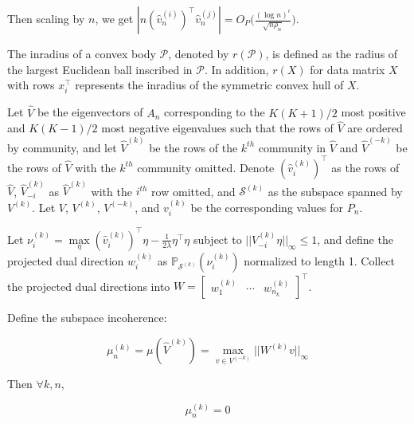 \documentclass[12pt]{article}
\begin{document}
Then scaling by \(n\), we get
\(|n (\hat{v}_n^{(i)})^\top \hat{v}_n^{(j)}| = O_P \big( \frac{(\log n)^c}{\sqrt{n \rho_n}} \big)\).

\begin{definition}
The inradius of a convex body $\mathcal{P}$, denoted by $r(\mathcal{P})$, is
defined as the radius of the largest Euclidean ball inscribed in $\mathcal{P}$.
In addition, $r(X)$ for data matrix $X$ with rows $x_i^\top$ represents
the inradius of the symmetric convex hull of $X$.
\end{definition}

\begin{definition}
\end{definition}

\begin{lemma}
\label{lemma2}
Let $\hat{V}$ be the eigenvectors of $A_n$ corresponding to the $K (K + 1) / 2$ most positive and $K (K - 1) / 2$ most negative eigenvalues such that the rows of $\hat{V}$ are ordered by community, and let $\hat{V}^{(k)}$ be the rows of the $k^{th}$ community in $\hat{V}$ and $\hat{V}^{(-k)}$ be the rows of $\hat{V}$ with the $k^{th}$ community omitted. Denote $(\hat{v}_i^{(k)})^\top$ as the rows of $\hat{V}$, $\hat{V}_{-i}^{(k)}$ as $\hat{V}^{(k)}$ with the $i^{th}$ row omitted, and $\mathcal{S}^{(k)}$ as the subspace spanned by $V^{(k)}$. Let $V$, $V^{(k)}$, $V^{(-k)}$, and $v_i^{(k)}$ be the corresponding values for $P_n$.

Let $\nu_{i}^{(k)} = \max\limits_\eta (\hat{v}_i^{(k)})^\top \eta - \frac{1}{2 \lambda} \eta^\top \eta$ subject to $||V_{-i}^{(k)} \eta||_\infty \leq 1$, and define the projected dual direction $w_{i}^{(k)}$ as $\mathbb{P}_{\mathcal{S}^{(k)}}(\nu_i^{(k)})$ normalized to length 1. Collect the projected dual directions into $W = \begin{bmatrix} w_1^{(k)} & \cdots & w_{n_k}^{(k)} \end{bmatrix}^\top$.

Define the subspace incoherence:

$$\mu_n^{(k)} = \mu(\hat{V}^{(k)}) = \max\limits_{v \in V^{(-k)}} ||W^{(k)} v||_\infty$$

Then $\forall k, n$,

\begin{equation} \label{eq:mu-conv}
\mu_n^{(k)} = 0
\end{equation}
\end{lemma}
\end{document}

